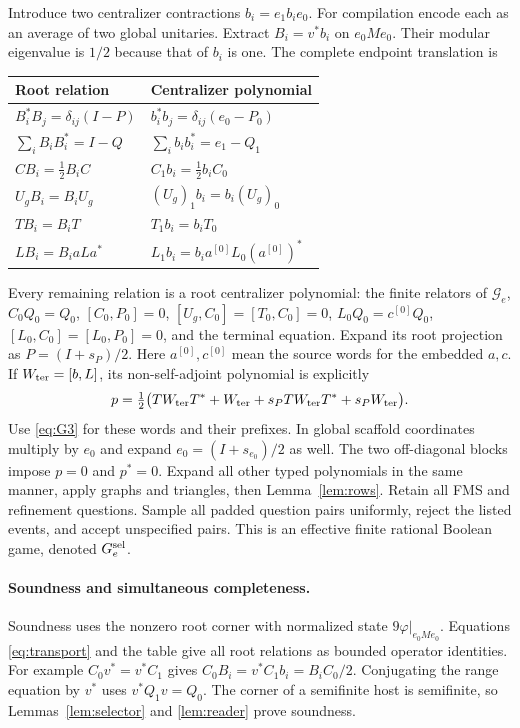 Introduce two centralizer contractions $b_i=e_1b_ie_0$. For compilation encode each as an average of two global unitaries. Extract $B_i=v^*b_i$ on $e_0Me_0$. Their modular eigenvalue is $1/2$ because that of $b_i$ is one. The complete endpoint translation is
\begin{center}\small
\begin{tabular}{@{}ll@{}}
\toprule Root relation & Centralizer polynomial\\\midrule
$B_i^*B_j=\delta_{ij}(I-P)$
& $b_i^*b_j=\delta_{ij}(e_0-P_0)$\\
$\sum_iB_iB_i^*=I-Q$ & $\sum_i b_ib_i^*=e_1-Q_1$\\
$CB_i=\frac12B_iC$ & $C_1b_i=\frac12b_iC_0$\\
$U_gB_i=B_iU_g$ & $(U_g)_1b_i=b_i(U_g)_0$\\
$TB_i=B_iT$ & $T_1b_i=b_iT_0$\\
$LB_i=B_i aLa^*$ & $L_1b_i=b_i a^{[0]}L_0(a^{[0]})^*$\\
\bottomrule
\end{tabular}
\end{center}
Every remaining relation is a root centralizer polynomial: the finite relators of $\mathcal G_e$, $C_0Q_0=Q_0$, $[C_0,P_0]=0$, $[U_g,C_0]=[T_0,C_0]=0$, $L_0Q_0=c^{[0]}Q_0$, $[L_0,C_0]=[L_0,P_0]=0$, and the terminal equation. Expand its root projection as $P=(I+s_P)/2$. Here $a^{[0]},c^{[0]}$ mean the source words for the embedded $a,c$. If $W_{\rm ter}=[b,L]$, its non-self-adjoint polynomial is explicitly
\[
 p=\tfrac12\bigl(TW_{\rm ter}T^*+W_{\rm ter}+s_PTW_{\rm ter}T^*+s_PW_{\rm ter}\bigr).
\]
Use \eqref{eq:G3} for these words and their prefixes. In global scaffold coordinates multiply by $e_0$ and expand $e_0=(I+s_{e_0})/2$ as well. The two off-diagonal blocks impose $p=0$ and $p^*=0$. Expand all other typed polynomials in the same manner, apply graphs and triangles, then Lemma~\ref{lem:rows}. Retain all FMS and refinement questions. Sample all padded question pairs uniformly, reject the listed events, and accept unspecified pairs. This is an effective finite rational Boolean game, denoted $G^{\rm sel}_e$.

\paragraph{Soundness and simultaneous completeness.}
Soundness uses the nonzero root corner with normalized state $9\varphi|_{e_0Me_0}$. Equations \eqref{eq:transport} and the table give all root relations as bounded operator identities. For example $C_0v^*=v^*C_1$ gives $C_0B_i=v^*C_1b_i=B_iC_0/2$. Conjugating the range equation by $v^*$ uses $v^*Q_1v=Q_0$. The corner of a semifinite host is semifinite, so Lemmas~\ref{lem:selector} and \ref{lem:reader} prove soundness.

